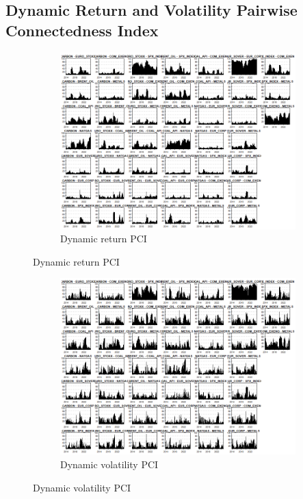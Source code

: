 \documentclass[preprint, 3p,
authoryear]{elsarticle} %
\begin{document}
\begin{landscape}
\newpage

\section{Dynamic Return and Volatility Pairwise Connectedness Index} \label{apdx:PCI}
\begin{figure}[!ht]
  \caption{Dynamic Return and Volatility Pairwise Connectedness Index (Jan 2013 – Jan 2025)}
  \label{fig:dynPCIfull}
  \centering
  \begin{subfigure}[a]{\textwidth}
    \caption{Dynamic return PCI}
    \label{fig:dynretPCIfull}
    \includegraphics[width = 1.1\linewidth]{7aApdxC-DynRetPCIfull}
  \end{subfigure}
\end{figure}
\begin{figure}[!ht]
  \ContinuedFloat
  \centering
    \begin{subfigure}[b]{\textwidth}\ContinuedFloat
      \caption{Dynamic volatility PCI}
      \label{fig:dynvolPCIfull}
      \includegraphics[width = 1.2\linewidth]{7bApdxC-DynVolPCIfull}
    \end{subfigure}
\end{figure}



\end{landscape}
\end{document}
